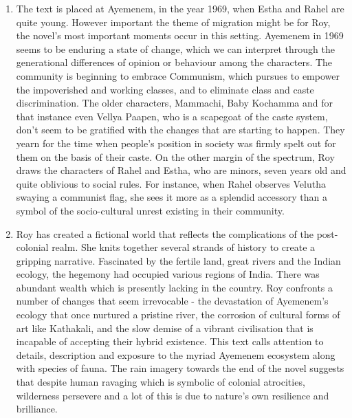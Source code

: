\begin{enumerate}
  \item The text is placed at Ayemenem, in the year 1969, when Estha and Rahel are quite young. However important the theme of migration might be for Roy, the novel's most important moments occur in this setting. Ayemenem in 1969 seems to be enduring a state of change, which we can interpret through the generational differences of opinion or behaviour among the characters. The community is beginning to embrace Communism, which pursues to empower the impoverished and working classes, and to eliminate class and caste discrimination. The older characters, Mammachi, Baby Kochamma and for that instance even Vellya Paapen, who is a scapegoat of the caste system, don't seem to be gratified with the changes that are starting to happen. They yearn for the time when people's position in society was firmly spelt out for them on the basis of their caste. On the other margin of the spectrum, Roy draws the characters of Rahel and Estha, who are minors, seven years old and quite oblivious to social rules. For instance, when Rahel observes Velutha swaying a communist flag, she sees it more as a splendid accessory than a symbol of the socio-cultural unrest existing in their community.

  \item Roy has created a fictional world that reflects the complications of the post-colonial realm.  She knits together several strands of history to create a gripping narrative.  Fascinated by the fertile land, great rivers and the Indian ecology, the hegemony had occupied various regions of India. There was abundant wealth which is presently lacking in the country.  Roy confronts a number of changes that seem irrevocable - the devastation of Ayemenem's ecology that once nurtured a pristine river, the corrosion of cultural forms of art like Kathakali, and the slow demise of a vibrant civilisation that is incapable of accepting their hybrid existence.  This text calls attention to details, description and exposure to the myriad Ayemenem ecosystem along with species of fauna. The rain imagery towards the end of the novel suggests that despite human ravaging which is symbolic of colonial atrocities, wilderness persevere and a lot of this is due to nature's own resilience and brilliance.


\end{enumerate}

